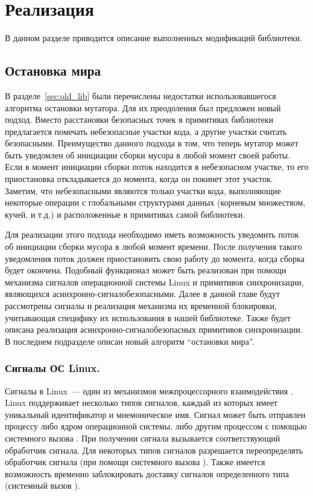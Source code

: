 \section{Реализация}

В данном разделе приводится описание выполненных модификаций библиотеки.


\subsection{Остановка мира}
\label{sec:stw}
В разделе~\ref{sec:old_lib} были перечислены недостатки использовавшегося алгоритма 
остановки мутатора. 
Для их преодоления был предложен новый подход. 
Вместо расстановки безопасных точек в примитивах библиотеки предлагается помечать 
небезопасные участки кода, а другие участки считать безопасными. 
Преимущество данного подхода в том, что теперь мутатор может быть уведомлен об инициации 
сборки мусора в любой момент своей работы. 
Если в момент инициации сборки поток находится в небезопасном участке, то его приостановка 
откладывается до момента, когда он покинет этот участок. 
Заметим, что небезопасными являются только участки кода, выполняющие некоторые операции с 
глобальными структурами данных (корневым множеством, кучей, и т.д.) и расположенные в 
примитивах самой библиотеки.

Для реализации этого подхода необходимо иметь возможность уведомить поток об инициации 
сборки мусора в любой момент времени. 
После получения такого уведомления поток должен приостановить свою работу до момента, 
когда сборка будет окончена. 
Подобный функционал может быть реализован при помощи механизма сигналов операционной системы 
Linux и примитивов синхронизации, являющихся асинхронно-сигналобезопасными. 
Далее в данной главе будут рассмотрены сигналы и реализация механизма их временной блокировки, 
учитывающая специфику их использования в нашей библиотеке. 
Также будет описана реализация асинхронно-сигналобезопасных примитивов синхронизации. 
В последнем подразделе описан новый алгоритм ``остановки мира''. 


\subsubsection{Сигналы ОС Linux.}
Сигналы в Linux~--- один из механизмов межпроцессорного взаимодействия \cite{book:os_linux}. 
Linux поддерживает несколько типов сигналов, каждый из которых имеет уникальный идентификатор 
и мнемоническое имя. 
Сигнал может быть отправлен процессу либо ядром операционной системы, либо другим процессом 
с помощью системного вызова . 
При получении сигнала вызывается соответствующий обработчик сигнала. 
Для некоторых типов сигналов разрешается переопределять обработчик сигнала (при помощи 
системного вызова ). 
Также имеется возможность временно заблокировать доставку сигналов определенного типа 
(системный вызов ).

